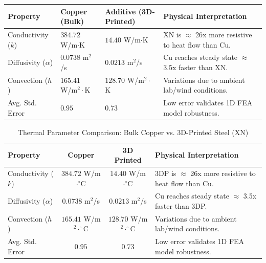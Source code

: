 \documentclass[12pt]{article}
\begin{document}
\vspace{10cm}


\begin{table}[h]
\centering
\label{tab:material_comparison}
\begin{tabularx}{\textwidth}{lXXX}
\toprule
\textbf{Property} & \textbf{Copper (Bulk)} & \textbf{Additive (3D-Printed)} & \textbf{Physical Interpretation} \\
\midrule
Conductivity ($k$) & $384.72$ W/m$\cdot$K & $14.40$ W/m$\cdot$K & XN is $\approx$ 26x more resistive to heat flow than Cu. \\
\addlinespace
Diffusivity ($\alpha$) & $0.0738$ m$^2$/s & $0.0213$ m$^2$/s & Cu reaches steady state $\approx$ 3.5x faster than XN. \\
\addlinespace
Convection ($h$) & $165.41$ W/m$^2\cdot$K & $128.70$ W/m$^2\cdot$K & Variations due to ambient lab/wind conditions. \\
\addlinespace
Avg. Std. Error & $0.95$ & $0.73$ & Low error validates 1D FEA model robustness. \\
\bottomrule
\end{tabularx}
\end{table}




\begin{table}[h]
\centering
\caption{Thermal Parameter Comparison: Bulk Copper vs. 3D-Printed Steel (XN)}
\label{tab:material_comparison}
\begin{tabularx}{\textwidth}{l c c X}
\toprule
\textbf{Property} & \textbf{Copper} & \textbf{3D Printed} & \textbf{Physical Interpretation} \\
\midrule
Conductivity ($k$) & $384.72$ W/m$\cdot^{\circ}\text{C}$ & $14.40$ W/m$\cdot^{\circ}\text{C}$ & 3DP is $\approx$ 26x more resistive to heat flow than Cu. \\
\addlinespace
Diffusivity ($\alpha$) & $0.0738$ m$^2$/s & $0.0213$ m$^2$/s & Cu reaches steady state $\approx$ 3.5x faster than 3DP. \\
\addlinespace
Convection ($h$) & $165.41$ W/m$^2\cdot^{\circ}\text{C} $& $128.70$ W/m$^2\cdot^{\circ}\text{C}$ & Variations due to ambient lab/wind conditions. \\
\addlinespace
Avg. Std. Error & $0.95$ & $0.73$ & Low error validates 1D FEA model robustness. \\
\bottomrule
\end{tabularx}
\end{table}
\end{document}
